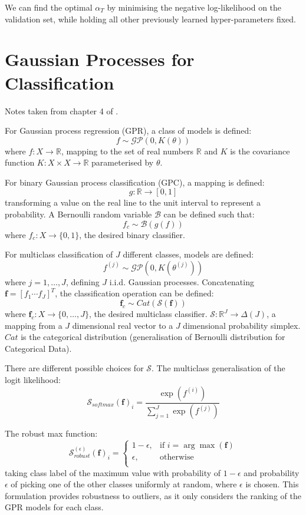\documentclass[twoside,11pt]{article}
\begin{document}
We can find the optimal $\alpha_T$ by minimising the negative log-likelihood on the validation set, while holding all other previously learned hyper-parameters fixed.


\section{Gaussian Processes for Classification}\label{sec:gaussian-processes-for-classification}

Notes taken from chapter 4 of \cite{matthews2017scalable}.

For Gaussian process regression (GPR), a class of models is defined:
\[f \sim \mathcal{GP}(0, K(\theta))\]
where $f: X \rightarrow \mathbb{R}$, mapping to the set of real numbers $\mathbb{R}$ and $K$ is the covariance function $K: X \times X \rightarrow \mathbb{R}$ parameterised by $\theta$.

For binary Gaussian process classification (GPC), a mapping is defined:
\[g: \mathbb{R} \rightarrow [0, 1]\]
transforming a value on the real line to the unit interval to represent a probability.
A Bernoulli random variable $\mathcal{B}$ can be defined such that:
\[f_c \sim \mathcal{B}(g(f))\]
where $f_c: X \rightarrow \{0, 1\}$, the desired binary classifier.

For multiclass classification of $J$ different classes, models are defined:
\[f^{(j)} \sim \mathcal{GP}(0, K(\theta^{(j)}))\]
where $j=1, \dots, J$, defining $J$ i.i.d. Gaussian processes.
Concatenating $\mathbf{f} = [f_1 \cdots f_J]^T$, the classification operation can be defined:
\[\mathbf{f}_c \sim Cat (\mathcal{S}(\mathbf{f}))\]
where $\mathbf{f}_c: X \rightarrow \{0, \dots, J\}$, the desired multiclass classifier. $\mathcal{S}: \mathbb{R}^J \rightarrow \Delta(J)$, a mapping from a $J$ dimensional real vector to a $J$ dimensional probability simplex. $Cat$ is the categorical distribution (generalisation of Bernoulli distribution for Categorical Data).

There are different possible choices for $\mathcal{S}$.
The multiclass generalisation of the logit likelihood:
\[\mathcal{S}_{softmax}(\mathbf{f})_i = \frac{\exp(f^{(i)})}{\sum_{j=1}^{J} \exp(f^{(j)})}\]

The robust max function:
\[\mathcal{S}_{robust}^{(\epsilon)}(\mathbf{f})_i = \begin{cases}
      1-\epsilon, &  \text{if } i = \arg \max(\mathbf{f}) \\
      \epsilon, & \text{otherwise} \\
   \end{cases}\]
taking class label of the maximum value with probability of $1-\epsilon$ and probability $\epsilon$ of picking one of the other classes uniformly at random, where $\epsilon$ is chosen.
This formulation provides robustness to outliers, as it only considers the ranking of the GPR models for each class.
\end{document}
